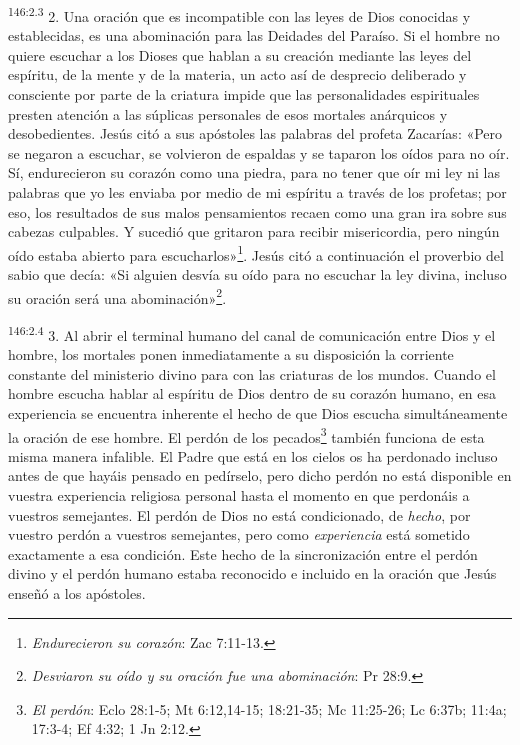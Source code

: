 \par 
\textsuperscript{146:2.3} 2. Una oración que es incompatible con las leyes de Dios conocidas y establecidas, es una abominación para las Deidades del Paraíso. Si el hombre no quiere escuchar a los Dioses que hablan a su creación mediante las leyes del espíritu, de la mente y de la materia, un acto así de desprecio deliberado y consciente por parte de la criatura impide que las personalidades espirituales presten atención a las súplicas personales de esos mortales anárquicos y desobedientes. Jesús citó a sus apóstoles las palabras del profeta Zacarías: «Pero se negaron a escuchar, se volvieron de espaldas y se taparon los oídos para no oír. Sí, endurecieron su corazón como una piedra, para no tener que oír mi ley ni las palabras que yo les enviaba por medio de mi espíritu a través de los profetas; por eso, los resultados de sus malos pensamientos recaen como una gran ira sobre sus cabezas culpables. Y sucedió que gritaron para recibir misericordia, pero ningún oído estaba abierto para escucharlos»\footnote{\textit{Endurecieron su corazón}: Zac 7:11-13.}. Jesús citó a continuación el proverbio del sabio que decía: «Si alguien desvía su oído para no escuchar la ley divina, incluso su oración será una abominación»\footnote{\textit{Desviaron su oído y su oración fue una abominación}: Pr 28:9.}.

\par 
\textsuperscript{146:2.4} 3. Al abrir el terminal humano del canal de comunicación entre Dios y el hombre, los mortales ponen inmediatamente a su disposición la corriente constante del ministerio divino para con las criaturas de los mundos. Cuando el hombre escucha hablar al espíritu de Dios dentro de su corazón humano, en esa experiencia se encuentra inherente el hecho de que Dios escucha simultáneamente la oración de ese hombre. El perdón de los pecados\footnote{\textit{El perdón}: Eclo 28:1-5; Mt 6:12,14-15; 18:21-35; Mc 11:25-26; Lc 6:37b; 11:4a; 17:3-4; Ef 4:32; 1 Jn 2:12.} también funciona de esta misma manera infalible. El Padre que está en los cielos os ha perdonado incluso antes de que hayáis pensado en pedírselo, pero dicho perdón no está disponible en vuestra experiencia religiosa personal hasta el momento en que perdonáis a vuestros semejantes. El perdón de Dios no está condicionado, de \textit{hecho}, por vuestro perdón a vuestros semejantes, pero como \textit{experiencia} está sometido exactamente a esa condición. Este hecho de la sincronización entre el perdón divino y el perdón humano estaba reconocido e incluido en la oración que Jesús enseñó a los apóstoles.

